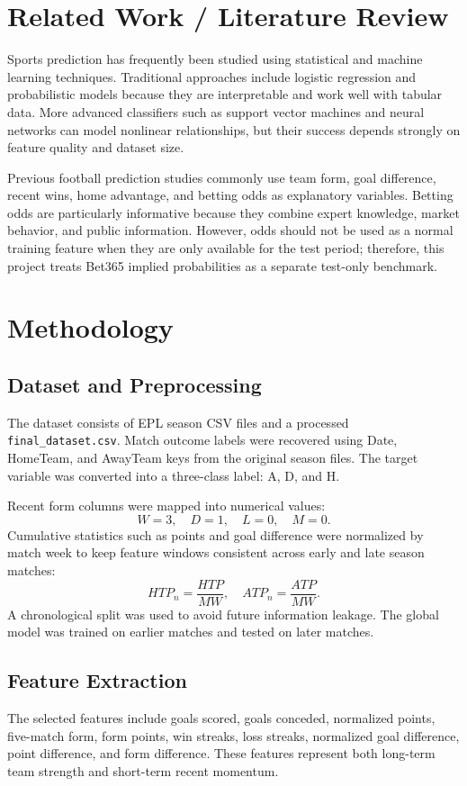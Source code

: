 \documentclass[10pt,a4paper]{article}
\begin{document}
\section{Related Work / Literature Review}
Sports prediction has frequently been studied using statistical and machine learning techniques. Traditional approaches include logistic regression and probabilistic models because they are interpretable and work well with tabular data. More advanced classifiers such as support vector machines and neural networks can model nonlinear relationships, but their success depends strongly on feature quality and dataset size.

Previous football prediction studies commonly use team form, goal difference, recent wins, home advantage, and betting odds as explanatory variables. Betting odds are particularly informative because they combine expert knowledge, market behavior, and public information. However, odds should not be used as a normal training feature when they are only available for the test period; therefore, this project treats Bet365 implied probabilities as a separate test-only benchmark.

\section{Methodology}
\subsection{Dataset and Preprocessing}
The dataset consists of EPL season CSV files and a processed \texttt{final\_dataset.csv}. Match outcome labels were recovered using Date, HomeTeam, and AwayTeam keys from the original season files. The target variable was converted into a three-class label: A, D, and H.

Recent form columns were mapped into numerical values:
\[
W=3, \quad D=1, \quad L=0, \quad M=0.
\]
Cumulative statistics such as points and goal difference were normalized by match week to keep feature windows consistent across early and late season matches:
\[
HTP_n = \frac{HTP}{MW}, \quad ATP_n = \frac{ATP}{MW}.
\]
A chronological split was used to avoid future information leakage. The global model was trained on earlier matches and tested on later matches.

\subsection{Feature Extraction}
The selected features include goals scored, goals conceded, normalized points, five-match form, form points, win streaks, loss streaks, normalized goal difference, point difference, and form difference. These features represent both long-term team strength and short-term recent momentum.
\end{document}
